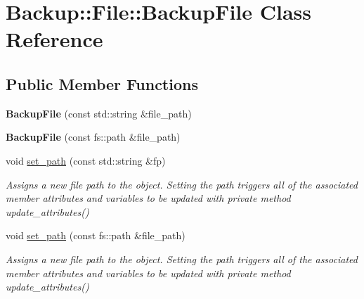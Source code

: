 \hypertarget{class_backup_1_1_file_1_1_backup_file}{}\section{Backup\+:\+:File\+:\+:Backup\+File Class Reference}
\label{class_backup_1_1_file_1_1_backup_file}
\subsection*{Public Member Functions}
\begin{DoxyCompactItemize}
\item 
\mbox{\label{class_backup_1_1_file_1_1_backup_file_a37c47e5e9c67cff51820f8f1cb3ea9f7}} 
{\bfseries Backup\+File} (const std\+::string \&file\+\_\+path)
\item 
\mbox{\label{class_backup_1_1_file_1_1_backup_file_aa74000b82da3e8e3ba33fb6e65f20f97}} 
{\bfseries Backup\+File} (const fs\+::path \&file\+\_\+path)
\item 
\mbox{\label{class_backup_1_1_file_1_1_backup_file_a2077b929aa3febb26717a810ce76d395}} 
void \hyperlink{class_backup_1_1_file_1_1_backup_file_a2077b929aa3febb26717a810ce76d395}{set\+\_\+path} (const std\+::string \&fp)
\begin{DoxyCompactList}\small\item\em Assigns a new file path to the object. Setting the path triggers all of the associated member attributes and variables to be updated with private method update\+\_\+attributes() \end{DoxyCompactList}\item 
\mbox{\label{class_backup_1_1_file_1_1_backup_file_a609874f97eb91023313e8fda7b8edb64}} 
void \hyperlink{class_backup_1_1_file_1_1_backup_file_a609874f97eb91023313e8fda7b8edb64}{set\+\_\+path} (const fs\+::path \&file\+\_\+path)
\begin{DoxyCompactList}\small\item\em Assigns a new file path to the object. Setting the path triggers all of the associated member attributes and variables to be updated with private method update\+\_\+attributes() \end{DoxyCompactList}\item 

\end{DoxyCompactItemize}

